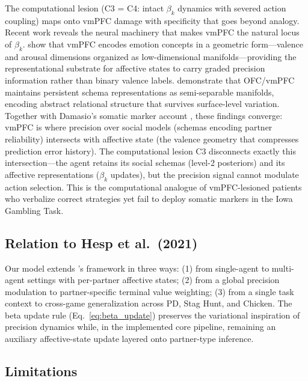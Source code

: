 \documentclass[11pt,a4paper]{article}
\begin{document}
The computational lesion (C3 = C4: intact $\beta_k$ dynamics with severed action coupling) maps onto vmPFC damage with specificity that goes beyond analogy. Recent work reveals the neural machinery that makes vmPFC the natural locus of $\beta_k$. \citet{bancee2026vmPFC} show that vmPFC encodes emotion concepts in a geometric form---valence and arousal dimensions organized as low-dimensional manifolds---providing the representational substrate for affective states to carry graded precision information rather than binary valence labels. \citet{baram2026ofc} demonstrate that OFC/vmPFC maintains persistent schema representations as semi-separable manifolds, encoding abstract relational structure that survives surface-level variation. Together with Damasio's somatic marker account \citep{damasio1994descartes}, these findings converge: vmPFC is where precision over social models (schemas encoding partner reliability) intersects with affective state (the valence geometry that compresses prediction error history). The computational lesion C3 disconnects exactly this intersection---the agent retains its social schemas (level-2 posteriors) and its affective representations ($\beta_k$ updates), but the precision signal cannot modulate action selection. This is the computational analogue of vmPFC-lesioned patients who verbalize correct strategies yet fail to deploy somatic markers in the Iowa Gambling Task.

\subsection{Relation to Hesp et al.\ (2021)}

Our model extends \citeauthor{hesp2021deeply}'s framework in three ways: (1) from single-agent to multi-agent settings with per-partner affective states; (2) from a global precision modulation to partner-specific terminal value weighting; (3) from a single task context to cross-game generalization across PD, Stag Hunt, and Chicken. The beta update rule (Eq.~\ref{eq:beta_update}) preserves the variational inspiration of precision dynamics while, in the implemented core pipeline, remaining an auxiliary affective-state update layered onto partner-type inference.

\subsection{Limitations}
\end{document}

